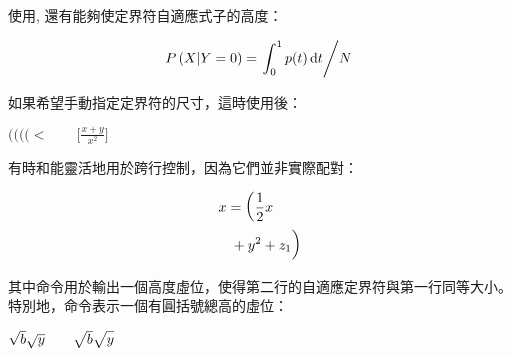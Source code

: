 使用, 還有能夠使定界符自適應式子的高度：
\begin{codeshow}
\[P\left(X \middle\vert Y=0\right)
=\left.\int_0^1 p(t)\mathop{}\negthinspace\mathrm{d} t\middle/ N\right.\]
\end{codeshow}

如果希望手動指定定界符的尺寸，這時使用後：
\begin{codeshow}
$(\big(\Big(\bigg(\Bigg<\qquad
\bigl[\frac{x+y}{x^2}\bigr]$
\end{codeshow}

有時和能靈活地用於跨行控制，因為它們並非實際配對：
\begin{codeshow}
\begin{align*}
  x &=\left(\frac{1}{2}x\right.\\
  &\left.\vphantom{\frac{1}{2}}
  +y^2+z_1\right)
\end{align*}
\end{codeshow}

其中命令用於輸出一個高度虛位，使得第二行的自適應定界符與第一行同等大小。特別地，命令表示一個有圓括號總高的虛位：
\begin{codeshow}
$\sqrt{b}\sqrt{y}\qquad
\sqrt{\mathstrut b}\sqrt{\mathstrut y}$
\end{codeshow}

